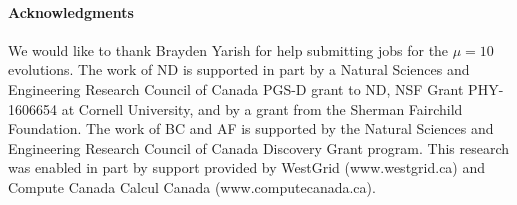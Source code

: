 \documentclass[../PhD.tex]{subfiles}
\begin{document}

\paragraph*{Acknowledgments}
We would like to thank Brayden Yarish for help submitting jobs for the
$\mu=10$ evolutions.
The work of ND is supported in part by a Natural Sciences and Engineering
Research Council of Canada PGS-D grant to ND, NSF Grant PHY-1606654
at Cornell University, and by a grant from the Sherman
Fairchild Foundation.
The work of BC and AF is supported by the Natural Sciences
and Engineering Research Council of Canada Discovery Grant program.
This research was enabled in part by support provided by WestGrid
(www.westgrid.ca) and Compute Canada Calcul Canada (www.computecanada.ca).

\end{document}
